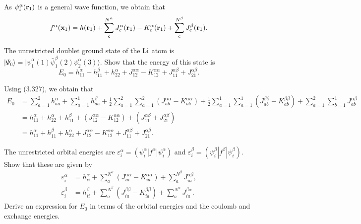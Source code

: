 \documentclass[a4paper]{book}
\newcounter{exercise}[chapter]
\newcounter{solution}[chapter]
\newcommand{\bfr}{{\bf r}}
\newcommand{\bfx}{{\bf x}}
\begin{document}
\begin{solution}
	As $\psi^\alpha_i( \bfr_1 )$ is a general wave function, we obtain that
	\begin{align*}
		f^\alpha( \bfx_1 ) = h( \bfr_1 ) + \sum_c^{N^\alpha} J^\alpha_c( \bfr_1 ) - K^\alpha_c( \bfr_1 ) + \sum_c^{N^\beta} J^\beta_c( \bfr_1 ) .
	\end{align*}
	
	\end{solution}
	
	\begin{exercise}
	The unrestricted doublet ground state of the $\ce{Li}$ atom is $|\Psi_0 \rangle = | \psi^\alpha_1(1) \bar{\psi}^\beta_1(2) \psi_2^\alpha(3) \rangle$. Show that the energy of this state is
	\[
		E_0 = h^\alpha_{11} + h^\beta_{11} + h^\alpha_{22} + J^{\alpha\alpha}_{12} - K^{\alpha\alpha}_{12} + J^{\alpha\beta}_{11} + J^{\alpha\beta}_{21}.
	\] 
	\end{exercise}
	
	\begin{solution}
	
	Using (3.327), we obtain that
	\begin{align*}
		E_0 &= \sum_{ a=1 }^2 h^\alpha_{aa} + \sum_{ a=1 }^1 h^\beta_{aa} + \frac{1}{2} \sum_{ a=1 }^2 \sum_{ a=1 }^2 ( J^{\alpha\alpha}_{ab} - K^{\alpha\alpha}_{ab} ) + \frac{1}{2} \sum_{ a=1 }^1 \sum_{ a=1 }^1 ( J^{\beta\beta}_{ab} - K^{\beta\beta}_{ab} ) + \sum_{ a=1 }^2 \sum_{ b=1 }^1 J^{\alpha\beta}_{ab} \\
		&= h^\alpha_{11} + h^\alpha_{22} + h^\beta_{11} + \left( J^{\alpha\alpha}_{12} - K^{\alpha\alpha}_{12} \right) + \left( J^{\alpha\beta}_{11} + J^{\alpha\beta}_{21} \right) \\
		&= h^\alpha_{11} + h^\beta_{11} + h^\alpha_{22} + J^{\alpha\alpha}_{12} - K^{\alpha\alpha}_{12} + J^{\alpha\beta}_{11} + J^{\alpha\beta}_{21} .
	\end{align*}		
	
	\end{solution}
	
	\begin{exercise}
	The unrestricted orbital energies are $\varepsilon^\alpha_i = ( \psi^\alpha_i | f^\alpha | \psi^\alpha_i )$ and $\varepsilon^\beta_i = ( \psi^\beta_i | f^\beta | \psi^\beta_i )$. Show that these are given by
	\begin{align*}
		\varepsilon^\alpha_i &= h^\alpha_{ii} + \sum^{N^\alpha}_a \left( J^{\alpha\alpha}_{ia} - K^{\alpha\alpha}_{ia} \right) + \sum^{N^\beta}_a J^{\alpha\beta}_{ia} , \\
		 \varepsilon^\beta_i &= h^\beta_{ii} + \sum^{N^\beta}_a \left( J^{\beta\beta}_{ia} - K^{\beta\beta}_{ia} \right) + \sum^{N^\alpha}_a J^{\beta\alpha}_{ia} .
	\end{align*}
	Derive an expression for $E_0$ in terms of the orbital energies and the coulomb and exchange energies.
	\end{exercise}
	
\end{document}
